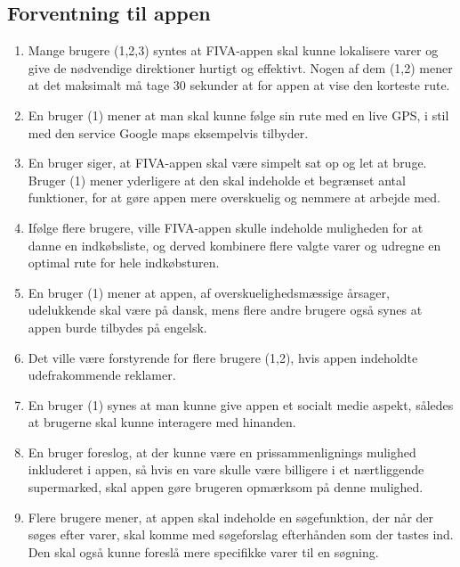 \documentclass[12pt]{article}
\begin{document}
\subsection{Forventning til appen}
\begin{enumerate}
\item Mange brugere (1,2,3) syntes at FIVA-appen skal kunne lokalisere varer og give de nødvendige direktioner hurtigt og effektivt. Nogen af dem (1,2) mener at det maksimalt må tage 30 sekunder at for appen at vise den korteste rute.

\item En bruger (1) mener at man skal kunne følge sin rute med en live GPS, i stil med den service Google maps eksempelvis tilbyder.\\

\item En bruger siger, at FIVA-appen skal være simpelt sat op og let at bruge. Bruger (1) mener yderligere at den skal indeholde et begrænset antal funktioner, for at gøre appen mere overskuelig og nemmere at arbejde med. 

\item Ifølge flere brugere, ville FIVA-appen skulle indeholde muligheden for at danne en indkøbsliste, og derved kombinere flere valgte varer og udregne en optimal rute for hele indkøbsturen.

\item En bruger (1) mener at appen, af overskuelighedsmæssige årsager, udelukkende skal være på dansk, mens flere andre brugere også synes at appen burde tilbydes på engelsk.

\item Det ville være forstyrende for flere brugere (1,2), hvis appen indeholdte udefrakommende reklamer.

\item En bruger (1) synes at man kunne give appen et socialt medie aspekt, således at brugerne skal kunne interagere med hinanden.

\item En bruger foreslog, at der kunne være en prissammenlignings mulighed inkluderet i appen, så hvis en vare skulle være billigere i et nærtliggende supermarked, skal appen gøre brugeren opmærksom på denne mulighed.

\item Flere brugere mener, at appen skal indeholde en søgefunktion, der når der søges efter varer, skal komme med søgeforslag efterhånden som der tastes ind. Den skal også kunne foreslå mere specifikke varer til en søgning.
\end{enumerate}
\end{document}

